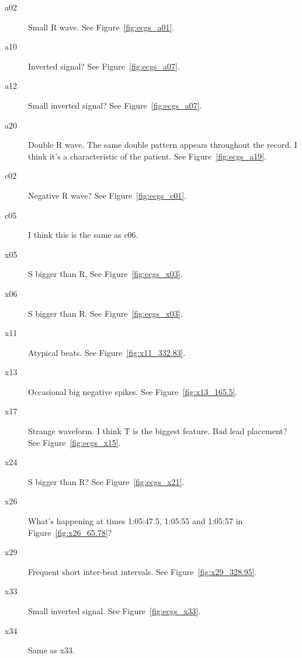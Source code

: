 \documentclass[12pt]{article}
\begin{document}
\begin{description}
\item[a02] Small R wave.  See Figure~\ref{fig:ecgs_a01}.
\item[a10] Inverted signal?  See Figure~\ref{fig:ecgs_a07}.
\item[a12] Small inverted signal?  See Figure~\ref{fig:ecgs_a07}.
\item[a20] Double R wave.  The same double pattern appears throughout
  the record.  I think it's a characteristic of the patient.  See
  Figure~\ref{fig:ecgs_a19}.
\item[c02] Negative R wave?  See Figure~\ref{fig:ecgs_c01}.
\item[c05] I think this is the same as c06.
\item[x05] S bigger than R.  See Figure~\ref{fig:ecgs_x03}.
\item[x06] S bigger than R.  See Figure~\ref{fig:ecgs_x03}.
\item[x11] Atypical beats.  See Figure~\ref{fig:x11_332.83}.
\item[x13] Occasional big negative spikes.  See
  Figure~\ref{fig:x13_165.5}.
\item[x17] Strange waveform.  I think T is the biggest feature.  Bad
  lead placement?  See Figure~\ref{fig:ecgs_x15}.
\item[x24] S bigger than R?  See Figure~\ref{fig:ecgs_x21}.
\item[x26] What's happening at times 1:05:47.5,
  1:05:55 and 1:05:57 in Figure~\ref{fig:x26_65.78}?
\item[x29] Frequent short inter-beat intervals.  See
  Figure~\ref{fig:x29_328.95}.
\item[x33] Small inverted signal.  See Figure~\ref{fig:ecgs_x33}.
\item[x34] Same as x33.
\end{description}

\newcommand{\StrangePlot}[2]{
  \begin{figure}
    \centering
    \resizebox{1,0\textwidth}{!}{\texttt{[image: \#1.pdf]}}
    \caption{#2}
    \label{fig:#1}
  \end{figure}
}
\end{document}
